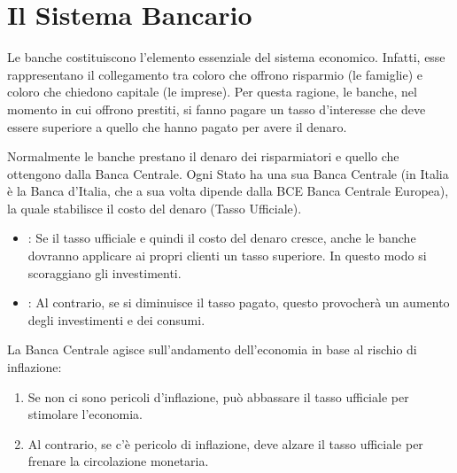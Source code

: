\documentclass[letterpaper,10pt,italian]{sphinxmanual}
\begin{document}
\sphinxstepscope


\chapter{Il Sistema Bancario}
\label{\detokenize{Il Sistema Bancario:il-sistema-bancario}}\label{\detokenize{Il Sistema Bancario::doc}}
\sphinxAtStartPar
Le banche costituiscono l’elemento essenziale del sistema economico.
Infatti, esse rappresentano il collegamento tra coloro che offrono risparmio (le famiglie) e coloro che chiedono capitale (le imprese). Per questa ragione, le banche, nel momento in cui offrono prestiti, si fanno pagare un tasso d’interesse che deve essere superiore a quello che hanno pagato per avere il denaro.

\sphinxAtStartPar
{}

\sphinxAtStartPar
Normalmente le banche prestano il denaro dei risparmiatori e quello che ottengono dalla Banca Centrale. Ogni Stato ha una sua Banca Centrale (in Italia è la Banca d’Italia, che a sua volta dipende dalla BCE \sphinxhyphen{} Banca Centrale Europea), la quale stabilisce il costo del denaro (Tasso Ufficiale).

\sphinxAtStartPar
{}
\begin{itemize}
\item {} 
\sphinxAtStartPar
{}: Se il tasso ufficiale e quindi il costo del denaro cresce, anche le banche dovranno applicare ai propri clienti un tasso superiore. In questo modo si scoraggiano gli investimenti.

\item {} 
\sphinxAtStartPar
{}: Al contrario, se si diminuisce il tasso pagato, questo provocherà un aumento degli investimenti e dei consumi.

\end{itemize}

\sphinxAtStartPar
{}

\sphinxAtStartPar
La Banca Centrale agisce sull’andamento dell’economia in base al rischio di inflazione:
\begin{enumerate}
%
\item {} 
\sphinxAtStartPar
Se non ci sono pericoli d’inflazione, può abbassare il tasso ufficiale per stimolare l’economia.

\item {} 
\sphinxAtStartPar
Al contrario, se c’è pericolo di inflazione, deve alzare il tasso ufficiale per frenare la circolazione monetaria.

\end{enumerate}
\end{document}
